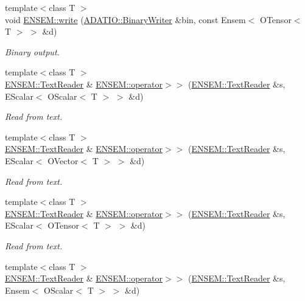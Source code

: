 \begin{DoxyCompactItemize}
{\footnotesize template$<$class T $>$ }\\void \mbox{\hyperlink{namespaceENSEM_afe08b2232fc0a37c7998d170fcf26ec0}{E\+N\+S\+E\+M\+::write}} (\mbox{\hyperlink{classADATIO_1_1BinaryWriter}{A\+D\+A\+T\+I\+O\+::\+Binary\+Writer}} \&bin, const Ensem$<$ O\+Tensor$<$ T $>$ $>$ \&d)
\begin{DoxyCompactList}\small\item\em Binary output. \end{DoxyCompactList}\item 
{\footnotesize template$<$class T $>$ }\\\mbox{\hyperlink{classENSEM_1_1TextReader}{E\+N\+S\+E\+M\+::\+Text\+Reader}} \& \mbox{\hyperlink{namespaceENSEM_a50e3d2025db65f9542e1c884553a842b}{E\+N\+S\+E\+M\+::operator$>$$>$}} (\mbox{\hyperlink{classENSEM_1_1TextReader}{E\+N\+S\+E\+M\+::\+Text\+Reader}} \&s, E\+Scalar$<$ O\+Scalar$<$ T $>$ $>$ \&d)
\begin{DoxyCompactList}\small\item\em Read from text. \end{DoxyCompactList}\item 
{\footnotesize template$<$class T $>$ }\\\mbox{\hyperlink{classENSEM_1_1TextReader}{E\+N\+S\+E\+M\+::\+Text\+Reader}} \& \mbox{\hyperlink{namespaceENSEM_a14c9e48b1126ae8aad1c0ccc1b7e6e05}{E\+N\+S\+E\+M\+::operator$>$$>$}} (\mbox{\hyperlink{classENSEM_1_1TextReader}{E\+N\+S\+E\+M\+::\+Text\+Reader}} \&s, E\+Scalar$<$ O\+Vector$<$ T $>$ $>$ \&d)
\begin{DoxyCompactList}\small\item\em Read from text. \end{DoxyCompactList}\item 
{\footnotesize template$<$class T $>$ }\\\mbox{\hyperlink{classENSEM_1_1TextReader}{E\+N\+S\+E\+M\+::\+Text\+Reader}} \& \mbox{\hyperlink{namespaceENSEM_a09c1f3286f4513b7ecefb96943278df6}{E\+N\+S\+E\+M\+::operator$>$$>$}} (\mbox{\hyperlink{classENSEM_1_1TextReader}{E\+N\+S\+E\+M\+::\+Text\+Reader}} \&s, E\+Scalar$<$ O\+Tensor$<$ T $>$ $>$ \&d)
\begin{DoxyCompactList}\small\item\em Read from text. \end{DoxyCompactList}\item 
{\footnotesize template$<$class T $>$ }\\\mbox{\hyperlink{classENSEM_1_1TextReader}{E\+N\+S\+E\+M\+::\+Text\+Reader}} \& \mbox{\hyperlink{namespaceENSEM_a5d4f982512e5f2e704e9f359ce2bf383}{E\+N\+S\+E\+M\+::operator$>$$>$}} (\mbox{\hyperlink{classENSEM_1_1TextReader}{E\+N\+S\+E\+M\+::\+Text\+Reader}} \&s, Ensem$<$ O\+Scalar$<$ T $>$ $>$ \&d)

\end{DoxyCompactItemize}
